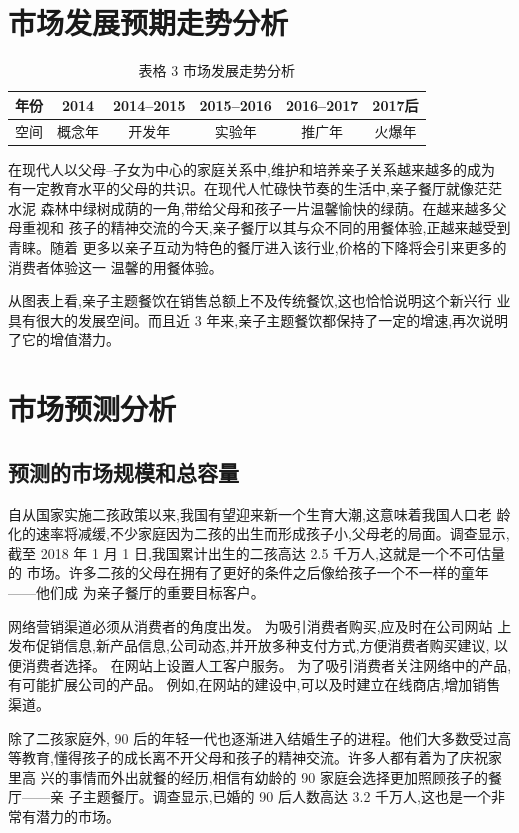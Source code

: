 \section{市场发展预期走势分析}
\begin{table}[htbp]
\centering
\caption{表格 3 市场发展走势分析}
\begin{tabular}{|c|c|c|c|c|c|}
\hline
年份&2014&2014--2015&2015--2016&2016--2017&2017后\\
\hline
空间&概念年&开发年&实验年&推广年&火爆年\\
\hline
\end{tabular}
\end{table}

在现代人以父母--子女为中心的家庭关系中,维护和培养亲子关系越来越多的成为
有一定教育水平的父母的共识。在现代人忙碌快节奏的生活中,亲子餐厅就像茫茫水泥
森林中绿树成荫的一角,带给父母和孩子一片温馨愉快的绿荫。在越来越多父母重视和
孩子的精神交流的今天,亲子餐厅以其与众不同的用餐体验,正越来越受到青睐。随着
更多以亲子互动为特色的餐厅进入该行业,价格的下降将会引来更多的消费者体验这一
温馨的用餐体验。

从图表上看,亲子主题餐饮在销售总额上不及传统餐饮,这也恰恰说明这个新兴行
业具有很大的发展空间。而且近 3 年来,亲子主题餐饮都保持了一定的增速,再次说明
了它的增值潜力。

\section{市场预测分析}

\subsection{预测的市场规模和总容量}
自从国家实施二孩政策以来,我国有望迎来新一个生育大潮,这意味着我国人口老
龄化的速率将减缓,不少家庭因为二孩的出生而形成孩子小,父母老的局面。调查显示,
截至 2018 年 1 月 1 日,我国累计出生的二孩高达 2.5 千万人,这就是一个不可估量的
市场。许多二孩的父母在拥有了更好的条件之后像给孩子一个不一样的童年——他们成
为亲子餐厅的重要目标客户。

网络营销渠道必须从消费者的角度出发。 为吸引消费者购买,应及时在公司网站
上发布促销信息,新产品信息,公司动态,并开放多种支付方式,方便消费者购买建议,
以便消费者选择。 在网站上设置人工客户服务。 为了吸引消费者关注网络中的产品,
有可能扩展公司的产品。 例如,在网站的建设中,可以及时建立在线商店,增加销售
渠道。

除了二孩家庭外, 90 后的年轻一代也逐渐进入结婚生子的进程。他们大多数受过高
等教育,懂得孩子的成长离不开父母和孩子的精神交流。许多人都有着为了庆祝家里高
兴的事情而外出就餐的经历,相信有幼龄的 90 家庭会选择更加照顾孩子的餐厅——亲
子主题餐厅。调查显示,已婚的 90 后人数高达 3.2 千万人,这也是一个非常有潜力的市场。

